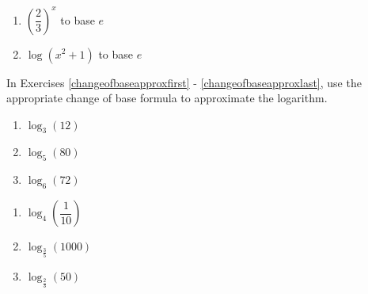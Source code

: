 \begin{multicols}{2}
\begin{enumerate}
\setcounter{enumi}{\value{HW}}

\item $\left(\dfrac{2}{3}\right)^{x}$ to base $e$
\item $\log(x^{2} + 1)$ to base $e$ \label{changeofbaselast}

\setcounter{HW}{\value{enumi}}
\end{enumerate}
\end{multicols}

\newpage

In Exercises \ref{changeofbaseapproxfirst} - \ref{changeofbaseapproxlast}, use the appropriate change of base formula to approximate the logarithm.

\begin{multicols}{3}
\begin{enumerate}
\setcounter{enumi}{\value{HW}}

\item $\log_{3}(12)$ \label{changeofbaseapproxfirst}
\item $\log_{5}(80)$
\item $\log_{6}(72)$

\setcounter{HW}{\value{enumi}}
\end{enumerate}
\end{multicols}

\begin{multicols}{3}
\begin{enumerate}
\setcounter{enumi}{\value{HW}}

\item $\log_{4}\left(\dfrac{1}{10}\right)$
\item $\log_{\frac{3}{5}}(1000)$ 
\item $\log_{\frac{2}{3}}(50)$  \label{changeofbaseapproxlast}

\setcounter{HW}{\value{enumi}}
\end{enumerate}
\end{multicols}

